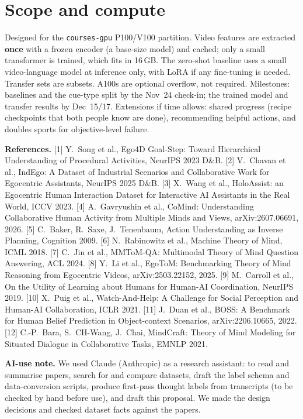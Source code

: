\documentclass[10pt]{article}
\begin{document}
\section{Scope and compute}
Designed for the \texttt{courses-gpu} P100/V100 partition. Video features are extracted \textbf{once} with a frozen encoder (a base-size model) and cached; only a small transformer is trained, which fits in 16\,GB. The zero-shot baseline uses a small video-language model at inference only, with LoRA if any fine-tuning is needed. Transfer sets are subsets. A100s are optional overflow, not required. Milestones: baselines and the cue-type split by the Nov~24 check-in; the trained model and transfer results by Dec~15/17. Extensions if time allows: shared progress (recipe checkpoints that both people know are done), recommending helpful actions, and doubles sports for objective-level failure.

\vspace{3pt}
{\scriptsize
\textbf{References.}
[1] Y.~Song et al., Ego4D Goal-Step: Toward Hierarchical Understanding of Procedural Activities, NeurIPS 2023 D\&B.
[2] V.~Chavan et al., IndEgo: A Dataset of Industrial Scenarios and Collaborative Work for Egocentric Assistants, NeurIPS 2025 D\&B.
[3] X.~Wang et al., HoloAssist: an Egocentric Human Interaction Dataset for Interactive AI Assistants in the Real World, ICCV 2023.
[4] A.~Gavryushin et al., CoMind: Understanding Collaborative Human Activity from Multiple Minds and Views, arXiv:2607.06691, 2026.
[5] C.~Baker, R.~Saxe, J.~Tenenbaum, Action Understanding as Inverse Planning, Cognition 2009.
[6] N.~Rabinowitz et al., Machine Theory of Mind, ICML 2018.
[7] C.~Jin et al., MMToM-QA: Multimodal Theory of Mind Question Answering, ACL 2024.
[8] Y.~Li et al., EgoToM: Benchmarking Theory of Mind Reasoning from Egocentric Videos, arXiv:2503.22152, 2025.
[9] M.~Carroll et al., On the Utility of Learning about Humans for Human-AI Coordination, NeurIPS 2019.
[10] X.~Puig et al., Watch-And-Help: A Challenge for Social Perception and Human-AI Collaboration, ICLR 2021.
[11] J.~Duan et al., BOSS: A Benchmark for Human Belief Prediction in Object-context Scenarios, arXiv:2206.10665, 2022.
[12] C.-P.~Bara, S.~CH-Wang, J.~Chai, MindCraft: Theory of Mind Modeling for Situated Dialogue in Collaborative Tasks, EMNLP 2021.

\vspace{2pt}
\textbf{AI-use note.} We used Claude (Anthropic) as a research assistant: to read and summarise papers, search for and compare datasets, draft the label schema and data-conversion scripts, produce first-pass thought labels from transcripts (to be checked by hand before use), and draft this proposal. We made the design decisions and checked dataset facts against the papers.
}
\end{document}
